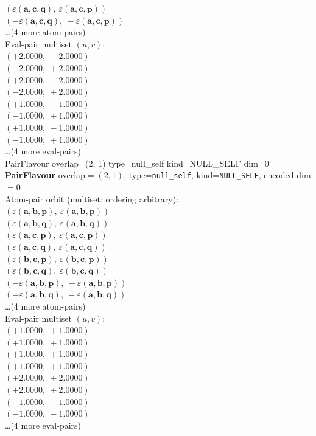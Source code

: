 \documentclass[a4paper,11pt]{article}
\newcommand{\kblbmcpggoncpf}[3]{\varepsilon(\mathbf{#1},\mathbf{#2},\mathbf{#3})}
\begin{document}
$(\kblbmcpggoncpf{a}{c}{q},\ \kblbmcpggoncpf{a}{c}{p})$\\
$(-\kblbmcpggoncpf{a}{c}{q},\ -\kblbmcpggoncpf{a}{c}{p})$\\
\quad \ldots (4 more atom-pairs)\\
\quad Eval-pair multiset $(u, v)$:\\
$(+2.0000,\ -2.0000)$\\
$(-2.0000,\ +2.0000)$\\
$(+2.0000,\ -2.0000)$\\
$(-2.0000,\ +2.0000)$\\
$(+1.0000,\ -1.0000)$\\
$(-1.0000,\ +1.0000)$\\
$(+1.0000,\ -1.0000)$\\
$(-1.0000,\ +1.0000)$\\
\quad \ldots (4 more eval-pairs)\\
    PairFlavour  overlap=(2, 1)  type=null\_self  kind=NULL\_SELF  dim=0
\textbf{PairFlavour} overlap$=(2, 1)$, type=\texttt{null\_self}, kind=\texttt{NULL\_SELF}, encoded dim$=0$\\
\quad Atom-pair orbit (multiset; ordering arbitrary):\\
$(\kblbmcpggoncpf{a}{b}{p},\ \kblbmcpggoncpf{a}{b}{p})$\\
$(\kblbmcpggoncpf{a}{b}{q},\ \kblbmcpggoncpf{a}{b}{q})$\\
$(\kblbmcpggoncpf{a}{c}{p},\ \kblbmcpggoncpf{a}{c}{p})$\\
$(\kblbmcpggoncpf{a}{c}{q},\ \kblbmcpggoncpf{a}{c}{q})$\\
$(\kblbmcpggoncpf{b}{c}{p},\ \kblbmcpggoncpf{b}{c}{p})$\\
$(\kblbmcpggoncpf{b}{c}{q},\ \kblbmcpggoncpf{b}{c}{q})$\\
$(-\kblbmcpggoncpf{a}{b}{p},\ -\kblbmcpggoncpf{a}{b}{p})$\\
$(-\kblbmcpggoncpf{a}{b}{q},\ -\kblbmcpggoncpf{a}{b}{q})$\\
\quad \ldots (4 more atom-pairs)\\
\quad Eval-pair multiset $(u, v)$:\\
$(+1.0000,\ +1.0000)$\\
$(+1.0000,\ +1.0000)$\\
$(+1.0000,\ +1.0000)$\\
$(+1.0000,\ +1.0000)$\\
$(+2.0000,\ +2.0000)$\\
$(+2.0000,\ +2.0000)$\\
$(-1.0000,\ -1.0000)$\\
$(-1.0000,\ -1.0000)$\\
\quad \ldots (4 more eval-pairs)\\
\end{document}
